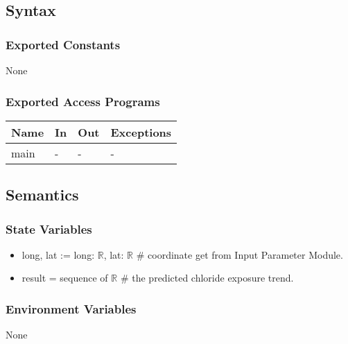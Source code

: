 \documentclass[12pt, titlepage]{article}
\begin{document}
\subsection{Syntax}

\subsubsection{Exported Constants}

None

\subsubsection{Exported Access Programs}

\begin{center}
\begin{tabular}{p{2cm} p{5cm} p{4cm} p{2cm}}
\hline
\textbf{Name} & \textbf{In} & \textbf{Out} & \textbf{Exceptions} \\
\hline
main & -  & - & - \\
\hline
\end{tabular}
\end{center}

\subsection{Semantics}

\subsubsection{State Variables}
\begin{itemize}
\item long, lat := long: $\mathbb{R}$, lat: $\mathbb{R}$ \# coordinate get from Input Parameter Module.
\item result = sequence of $\mathbb{R}$ \# the predicted chloride exposure trend.

\end{itemize}

\subsubsection{Environment Variables}

None

\end{document}
